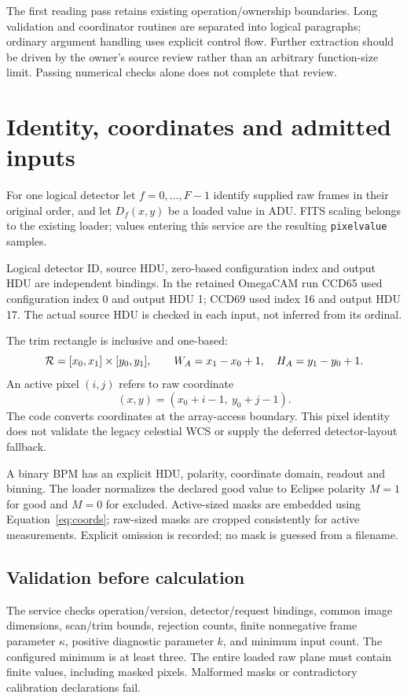 \documentclass[11pt,a4paper]{article}
\newcommand{\code}[1]{\nolinkurl{#1}}
\begin{document}
The first reading pass retains existing operation/ownership boundaries.
Long validation and coordinator routines are separated into logical paragraphs;
ordinary argument handling uses explicit control flow. Further extraction should
be driven by the owner's source review rather than an arbitrary function-size
limit. Passing numerical checks alone does not complete that review.

\newpage
\section{Identity, coordinates and admitted inputs}
For one logical detector let $f=0,\ldots,F-1$ identify supplied raw frames
in their original order, and let $D_f(x,y)$ be a loaded value in ADU.
FITS scaling belongs to the existing loader; values entering this service
are the resulting \code{pixelvalue} samples.

Logical detector ID, source HDU, zero-based configuration index and output HDU
are independent bindings. In the retained OmegaCAM run CCD65 used configuration
index 0 and output HDU 1; CCD69 used index 16 and output HDU 17.
The actual source HDU is checked in each input, not inferred from its ordinal.

The trim rectangle is inclusive and one-based:
\[
 {\cal R}=[x_0,x_1]\times[y_0,y_1],\qquad
 W_A=x_1-x_0+1,\quad H_A=y_1-y_0+1.
\]
An active pixel $(i,j)$ refers to raw coordinate
\begin{equation}
 (x,y)=(x_0+i-1,\ y_0+j-1). \label{eq:coords}
\end{equation}
The code converts coordinates at the array-access boundary.
This pixel identity does not validate the legacy celestial WCS or supply
the deferred detector-layout fallback.

A binary BPM has an explicit HDU, polarity, coordinate domain, readout and
binning. The loader normalizes the declared good value to Eclipse polarity
$M=1$ for good and $M=0$ for excluded. Active-sized masks are embedded using
Equation~\eqref{eq:coords}; raw-sized masks are cropped consistently for active
measurements. Explicit omission is recorded; no mask is guessed from a filename.

\subsection*{Validation before calculation}
The service checks operation/version, detector/request bindings, common image
dimensions, scan/trim bounds, rejection counts, finite nonnegative frame
parameter $\kappa$, positive diagnostic parameter $k$, and minimum input count.
The configured minimum is at least three. The entire loaded raw plane must
contain finite values, including masked pixels. Malformed masks or contradictory
calibration declarations fail.
\end{document}
